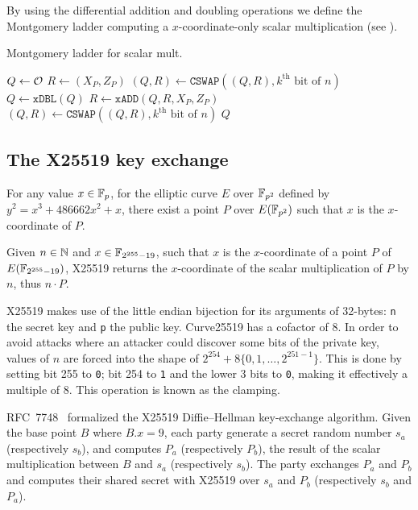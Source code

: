 By using the differential addition and doubling operations we define the Montgomery ladder
computing a $x$-coordinate-only scalar multiplication (see ).
\begin{algorithm}
\caption{Montgomery ladder for scalar mult.}
\label{alg:montgomery-ladder}
\begin{algorithmic}
\STATE $Q \leftarrow \mathcal{O}$
\STATE $R \leftarrow (X_P,Z_P)$
  \STATE $(Q,R) \leftarrow \texttt{CSWAP}((Q,R), k^{\text{th}}\text{ bit of }n)$
  \STATE $Q \leftarrow \texttt{xDBL}(Q)$
  \STATE $R \leftarrow \texttt{xADD}(Q,R,X_P,Z_P)$
  \STATE $(Q,R) \leftarrow \texttt{CSWAP}((Q,R), k^{\text{th}}\text{ bit of }n)$
\ENDFOR
\RETURN $Q$
\end{algorithmic}
\end{algorithm}

\subsection{The X25519 key exchange}
\label{subsec:X25519-key-exchange}

For any value $x \in \mathbb{F}_{p}$, for the elliptic curve $E$ over $\mathbb{F}_{p^2}$
defined by $y^2 = x^3 + 486662 x^2 + x$, there exist a point $P$ over $E(\mathbb{F}_{p^2})$
such that $x$ is the $x$-coordinate of $P$.

Given $n \in \mathbb{N}$ and $x \in \mathbb{F}_{2^{255}-19}$, such that $x$ is the $x$-coordinate of
a point $P$ of $E(\mathbb{F}_{2^{255}-19})$, X25519 returns the $x$-coordinate of the
scalar multiplication of $P$ by $n$, thus $n \cdot P$.

X25519 makes use of the little endian bijection for its arguments of 32-bytes:
\texttt{n} the secret key and \texttt{p} the public key.
Curve25519 has a cofactor of 8. In order to avoid attacks where an attacker
could discover some bits of the private key, values of $n$ are forced into the
shape of $2^{254} + 8\{0,1,\ldots,2^{251-1}\}$. This is done by setting bit 255
to \texttt{0}; bit 254 to \texttt{1} and the lower 3 bits to \texttt{0},
making it effectively a multiple of 8. This operation is known as the clamping.

RFC~7748~\cite{rfc7748} formalized the X25519 Diffie–Hellman key-exchange algorithm.
Given the base point $B$ where $B.x=9$, each party generate a secret random number
$s_a$ (respectively $s_b$), and computes $P_a$ (respectively $P_b$), the result
of the scalar multiplication between $B$ and $s_a$ (respectively $s_b$).
The party exchanges $P_a$ and $P_b$ and computes their shared secret with X25519
over $s_a$ and $P_b$ (respectively $s_b$ and $P_a$).

